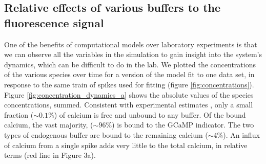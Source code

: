 \subsection{Relative effects of various buffers to the fluorescence signal}
One of the benefits of computational models over laboratory experiments is that we can observe all the variables in the simulation to gain insight into the system’s dynamics, which can be difficult to do in the lab. We plotted the concentrations of the various species over time for a version of the model fit to one data set, in response to the same train of spikes used for fitting (figure \ref{fig:concentrations}). Figure \ref{fig:concentration_dynamics_a} shows the absolute values of the species concentrations, summed. Consistent with experimental estimates  \parencite{maravall}, only a small fraction ($\sim 0.1\%$) of calcium is free and unbound to any buffer. Of the bound calcium, the vast majority, ($\sim 96\%$) is bound to the GCaMP indicator. The two types of endogenous buffer are bound to the remaining calcium ($\sim 4\%$). An influx of calcium from a single spike adds very little to the total calcium, in relative terms (red line in Figure 3a).
